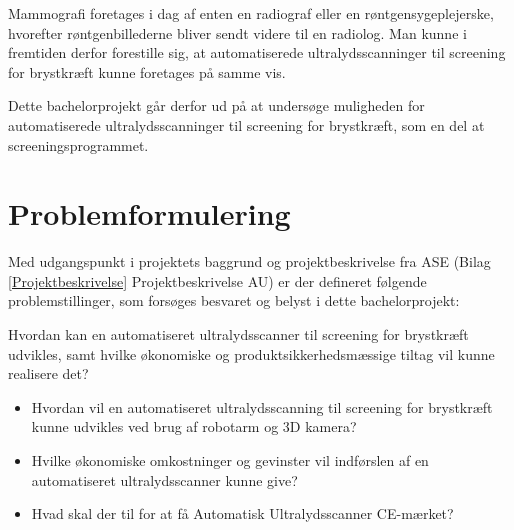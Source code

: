 Mammografi foretages i dag af enten en radiograf eller en røntgensygeplejerske, hvorefter røntgenbillederne bliver sendt videre til en radiolog. Man kunne i fremtiden derfor forestille sig, at automatiserede ultralydsscanninger til screening for brystkræft kunne foretages på samme vis.

Dette bachelorprojekt går derfor ud på at undersøge muligheden for automatiserede ultralydsscanninger til screening for brystkræft, som en del at screeningsprogrammet.

\section{Problemformulering}
Med udgangspunkt i projektets baggrund og projektbeskrivelse fra ASE (Bilag \ref{Projektbeskrivelse} Projektbeskrivelse AU) er der defineret følgende problemstillinger, som forsøges besvaret og belyst i dette bachelorprojekt:

Hvordan kan en automatiseret ultralydsscanner til screening for brystkræft udvikles, samt hvilke økonomiske og produktsikkerhedsmæssige tiltag vil kunne realisere det?

\let\labelitemi\labelitemii
\begin{itemize}
\item Hvordan vil en automatiseret ultralydsscanning til screening for brystkræft kunne udvikles ved brug af robotarm og 3D kamera?
\item Hvilke økonomiske omkostninger og gevinster vil indførslen af en automatiseret ultralydsscanner kunne give? 
\item Hvad skal der til for at få Automatisk Ultralydsscanner CE-mærket? 
\end{itemize}